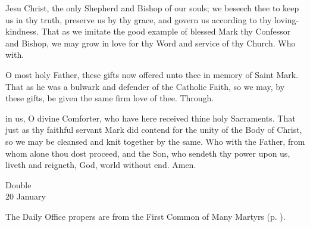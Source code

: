







\collect\label{EphesianCollect}
 Jesu Christ, the only Shepherd and Bishop of our souls; we beseech thee to keep us in thy truth, preserve us by thy grace, and govern us according to thy loving-kindness. That as we imitate the good example of blessed Mark thy Confessor and Bishop, we may grow in love for thy Word and service of thy Church. Who with.

\secret\label{EphesianSecret}
 O most holy Father, these gifts now offered unto thee in memory of Saint Mark. That as he was a bulwark and defender of the Catholic Faith, so we may, by these gifts, be given the same firm love of thee. Through.

\postcommunion\label{EphesianPostcommunion}
 in us, O divine Comforter, who have here received thine holy Sacraments. That just as thy faithful servant Mark did contend for the unity of the Body of Christ, so we may be cleansed and knit together by the same. Who with the Father, from whom alone thou dost proceed, and the Son, who sendeth thy power upon us, liveth and reigneth, God, world without end. Amen.


\begin{inhead}
    {Double\\
20 January}
\end{inhead}

\begin{rubric}
	The Daily Office propers are from the First Common of Many Martyrs (p. \pageref{CommonMartyrsI}).
\end{rubric}

